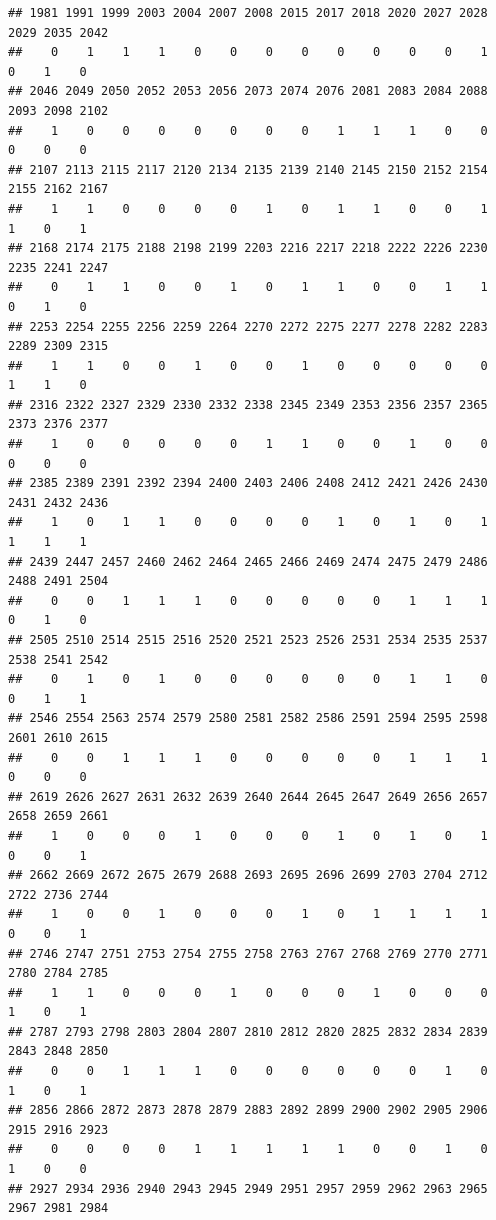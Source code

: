 \documentclass[
]{article}
\begin{document}
\begin{verbatim}
## 1981 1991 1999 2003 2004 2007 2008 2015 2017 2018 2020 2027 2028 2029 2035 2042 
##    0    1    1    1    0    0    0    0    0    0    0    0    1    0    1    0 
## 2046 2049 2050 2052 2053 2056 2073 2074 2076 2081 2083 2084 2088 2093 2098 2102 
##    1    0    0    0    0    0    0    0    1    1    1    0    0    0    0    0 
## 2107 2113 2115 2117 2120 2134 2135 2139 2140 2145 2150 2152 2154 2155 2162 2167 
##    1    1    0    0    0    0    1    0    1    1    0    0    1    1    0    1 
## 2168 2174 2175 2188 2198 2199 2203 2216 2217 2218 2222 2226 2230 2235 2241 2247 
##    0    1    1    0    0    1    0    1    1    0    0    1    1    0    1    0 
## 2253 2254 2255 2256 2259 2264 2270 2272 2275 2277 2278 2282 2283 2289 2309 2315 
##    1    1    0    0    1    0    0    1    0    0    0    0    0    1    1    0 
## 2316 2322 2327 2329 2330 2332 2338 2345 2349 2353 2356 2357 2365 2373 2376 2377 
##    1    0    0    0    0    0    1    1    0    0    1    0    0    0    0    0 
## 2385 2389 2391 2392 2394 2400 2403 2406 2408 2412 2421 2426 2430 2431 2432 2436 
##    1    0    1    1    0    0    0    0    1    0    1    0    1    1    1    1 
## 2439 2447 2457 2460 2462 2464 2465 2466 2469 2474 2475 2479 2486 2488 2491 2504 
##    0    0    1    1    1    0    0    0    0    0    1    1    1    0    1    0 
## 2505 2510 2514 2515 2516 2520 2521 2523 2526 2531 2534 2535 2537 2538 2541 2542 
##    0    1    0    1    0    0    0    0    0    0    1    1    0    0    1    1 
## 2546 2554 2563 2574 2579 2580 2581 2582 2586 2591 2594 2595 2598 2601 2610 2615 
##    0    0    1    1    1    0    0    0    0    0    1    1    1    0    0    0 
## 2619 2626 2627 2631 2632 2639 2640 2644 2645 2647 2649 2656 2657 2658 2659 2661 
##    1    0    0    0    1    0    0    0    1    0    1    0    1    0    0    1 
## 2662 2669 2672 2675 2679 2688 2693 2695 2696 2699 2703 2704 2712 2722 2736 2744 
##    1    0    0    1    0    0    0    1    0    1    1    1    1    0    0    1 
## 2746 2747 2751 2753 2754 2755 2758 2763 2767 2768 2769 2770 2771 2780 2784 2785 
##    1    1    0    0    0    1    0    0    0    1    0    0    0    1    0    1 
## 2787 2793 2798 2803 2804 2807 2810 2812 2820 2825 2832 2834 2839 2843 2848 2850 
##    0    0    1    1    1    0    0    0    0    0    0    1    0    1    0    1 
## 2856 2866 2872 2873 2878 2879 2883 2892 2899 2900 2902 2905 2906 2915 2916 2923 
##    0    0    0    0    1    1    1    1    1    0    0    1    0    1    0    0 
## 2927 2934 2936 2940 2943 2945 2949 2951 2957 2959 2962 2963 2965 2967 2981 2984 

\end{verbatim}
\end{document}

